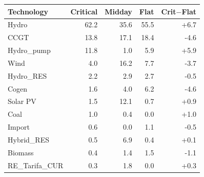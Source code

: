 \begin{tabular}{l r r r r}
\toprule
Technology & Critical & Midday & Flat & Crit$-$Flat \\
\midrule
Hydro & 62.2 & 35.6 & 55.5 & +6.7 \\
CCGT & 13.8 & 17.1 & 18.4 & -4.6 \\
Hydro\_pump & 11.8 & 1.0 & 5.9 & +5.9 \\
Wind & 4.0 & 16.2 & 7.7 & -3.7 \\
Hydro\_RES & 2.2 & 2.9 & 2.7 & -0.5 \\
Cogen & 1.6 & 4.0 & 6.2 & -4.6 \\
Solar PV & 1.5 & 12.1 & 0.7 & +0.9 \\
Coal & 1.0 & 0.4 & 0.0 & +1.0 \\
Import & 0.6 & 0.0 & 1.1 & -0.5 \\
Hybrid\_RES & 0.5 & 6.9 & 0.4 & +0.1 \\
Biomass & 0.4 & 1.4 & 1.5 & -1.1 \\
RE\_Tarifa\_CUR & 0.3 & 1.8 & 0.0 & +0.3 \\
\bottomrule
\end{tabular}
